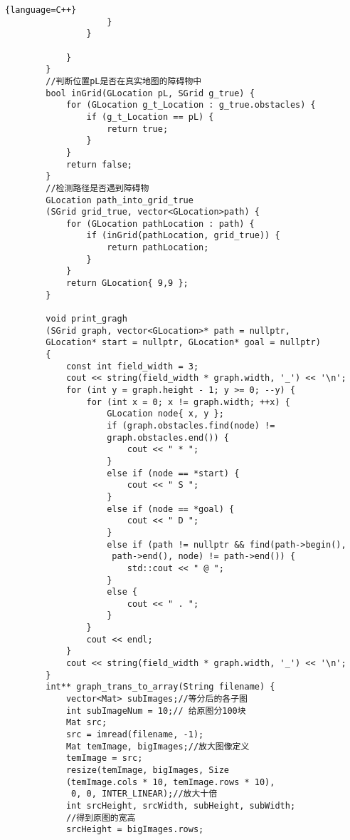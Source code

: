\documentclass[withoutpreface,bwprint]{cumcmthesis} %
\begin{document}
\begin{appendix}
\begin{lstlisting}{language=C++}
                    }
                }
                
            }
        }
        //判断位置pL是否在真实地图的障碍物中
        bool inGrid(GLocation pL, SGrid g_true) {
            for (GLocation g_t_Location : g_true.obstacles) {
                if (g_t_Location == pL) {
                    return true;
                }
            }
            return false;
        }
        //检测路径是否遇到障碍物
        GLocation path_into_grid_true
        (SGrid grid_true, vector<GLocation>path) {
            for (GLocation pathLocation : path) {
                if (inGrid(pathLocation, grid_true)) {
                    return pathLocation;
                }
            }
            return GLocation{ 9,9 };
        }
        
        void print_gragh
        (SGrid graph, vector<GLocation>* path = nullptr, 
        GLocation* start = nullptr, GLocation* goal = nullptr)
        {
            const int field_width = 3;
            cout << string(field_width * graph.width, '_') << '\n';
            for (int y = graph.height - 1; y >= 0; --y) {
                for (int x = 0; x != graph.width; ++x) {
                    GLocation node{ x, y };
                    if (graph.obstacles.find(node) != 
                    graph.obstacles.end()) {
                        cout << " * ";
                    }
                    else if (node == *start) {
                        cout << " S ";
                    }
                    else if (node == *goal) {
                        cout << " D ";
                    }
                    else if (path != nullptr && find(path->begin(),
                     path->end(), node) != path->end()) {
                        std::cout << " @ ";
                    }
                    else {
                        cout << " . ";
                    }
                }
                cout << endl;
            }
            cout << string(field_width * graph.width, '_') << '\n';
        }
        int** graph_trans_to_array(String filename) {
            vector<Mat> subImages;//等分后的各子图
            int subImageNum = 10;// 给原图分100块
            Mat src;
            src = imread(filename, -1);
            Mat temImage, bigImages;//放大图像定义
            temImage = src;
            resize(temImage, bigImages, Size
            (temImage.cols * 10, temImage.rows * 10),
             0, 0, INTER_LINEAR);//放大十倍
            int srcHeight, srcWidth, subHeight, subWidth;
            //得到原图的宽高
            srcHeight = bigImages.rows;

\end{lstlisting}
\end{appendix}
\end{document}
